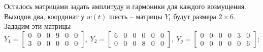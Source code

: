 \documentclass[a4paper, 12pt]{article}
\begin{document}
    Осталось матрицами задать амплитуду и гармоники для каждого возмущения. Выходов два,
    координат у $w(t)$ шесть -- матрицы $Y_i$ будут размера $2\times6$. Зададим эти матрицы
    $$
    Y_1=\begin{bmatrix}
        0 &0 &0 &9 &0 &0\\
        3 &0 &0 &0 &0 &0
    \end{bmatrix},\ Y_2=\begin{bmatrix}
        6 &0 &0 &0 &0 &0\\
        0 &0 &0 &8 &0 &0
    \end{bmatrix},\ Y_g=\begin{bmatrix}
        0 &0 &0 &0 &3 &0\\
        0 &0 &0 &0 &0 &6
    \end{bmatrix};
    $$

    
\end{document}
